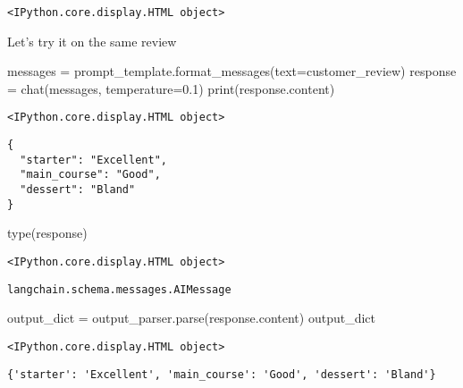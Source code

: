 \documentclass[
  letterpaper,
  DIV=11,
  numbers=noendperiod]{scrreprt}
\newenvironment{Shaded}{\begin{snugshade}}{\end{snugshade}}
\newcommand{\BuiltInTok}[1]{\textcolor[rgb]{0.00,0.23,0.31}{#1}}
\newcommand{\FloatTok}[1]{\textcolor[rgb]{0.68,0.00,0.00}{#1}}
\newcommand{\NormalTok}[1]{\textcolor[rgb]{0.00,0.23,0.31}{#1}}
\newcommand{\OperatorTok}[1]{\textcolor[rgb]{0.37,0.37,0.37}{#1}}
\begin{document}
\begin{verbatim}
<IPython.core.display.HTML object>
\end{verbatim}

Let's try it on the same review

\begin{Shaded}
\begin{Highlighting}[]
\NormalTok{messages }\OperatorTok{=}\NormalTok{ prompt\_template.format\_messages(text}\OperatorTok{=}\NormalTok{customer\_review)}
\NormalTok{response }\OperatorTok{=}\NormalTok{ chat(messages, temperature}\OperatorTok{=}\FloatTok{0.1}\NormalTok{)}
\BuiltInTok{print}\NormalTok{(response.content)}
\end{Highlighting}
\end{Shaded}

\begin{verbatim}
<IPython.core.display.HTML object>
\end{verbatim}

\begin{verbatim}
{
  "starter": "Excellent",
  "main_course": "Good",
  "dessert": "Bland"
}
\end{verbatim}

\begin{Shaded}
\begin{Highlighting}[]
\BuiltInTok{type}\NormalTok{(response)}
\end{Highlighting}
\end{Shaded}

\begin{verbatim}
<IPython.core.display.HTML object>
\end{verbatim}

\begin{verbatim}
langchain.schema.messages.AIMessage
\end{verbatim}

\begin{Shaded}
\begin{Highlighting}[]
\NormalTok{output\_dict }\OperatorTok{=}\NormalTok{ output\_parser.parse(response.content)}
\NormalTok{output\_dict}
\end{Highlighting}
\end{Shaded}

\begin{verbatim}
<IPython.core.display.HTML object>
\end{verbatim}

\begin{verbatim}
{'starter': 'Excellent', 'main_course': 'Good', 'dessert': 'Bland'}
\end{verbatim}
\end{document}
